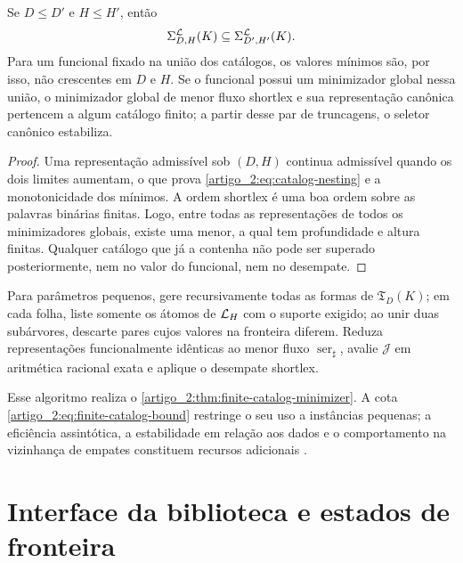 \begin{proposition}\label{map:artigo_2:3.24}
\label{artigo_2:prop:catalog-consistency}
Se $D\le D'$ e $H\le H'$, então
\begin{equation}
 \Sigma_{D,H}^{\mathcal{L}}(K)
 \subseteq\Sigma_{D',H'}^{\mathcal{L}}(K).
 \label{artigo_2:eq:catalog-nesting}
\end{equation}
Para um funcional fixado na união dos catálogos, os valores mínimos são, por
isso, não crescentes em $D$ e $H$. Se o funcional possui um minimizador global
nessa união, o minimizador global de menor fluxo shortlex e sua representação
canônica pertencem a algum catálogo finito; a partir desse par de truncagens,
o seletor canônico estabiliza.
\end{proposition}

\begin{proof}
Uma representação admissível sob $(D,H)$ continua admissível quando os dois
limites aumentam, o que prova \eqref{artigo_2:eq:catalog-nesting} e a monotonicidade dos
mínimos. A ordem shortlex é uma boa ordem sobre as palavras binárias finitas. Logo, entre
todas as representações de todos os minimizadores globais, existe uma menor,
a qual tem profundidade e altura finitas. Qualquer catálogo que já a contenha não
pode ser superado posteriormente, nem no valor do funcional, nem no desempate.
\end{proof}

\begin{algorithm}\label{map:artigo_2:3.25}\label{artigo_2:alg:finite-enumeration}
Para parâmetros pequenos, gere recursivamente todas as formas de
$\mathfrak T_D(K)$; em cada folha, liste somente os átomos de $\mathcal{L}_H$ com
o suporte exigido; ao unir duas subárvores, descarte pares cujos valores na
fronteira diferem. Reduza representações funcionalmente idênticas ao menor
fluxo $\operatorname{ser}_\sharp$, avalie $\mathcal J$ em aritmética racional
exata e aplique o desempate shortlex.
\end{algorithm}

Esse algoritmo realiza o
\cref{artigo_2:thm:finite-catalog-minimizer}. A cota
\eqref{artigo_2:eq:finite-catalog-bound} restringe o seu uso a instâncias pequenas;
a eficiência assintótica, a estabilidade em relação aos dados e o comportamento
na vizinhança de empates constituem recursos adicionais \citep{artigo_1-christof2021}.

\section{Interface da biblioteca e estados de fronteira}
\label{artigo_2:sec:interface}

